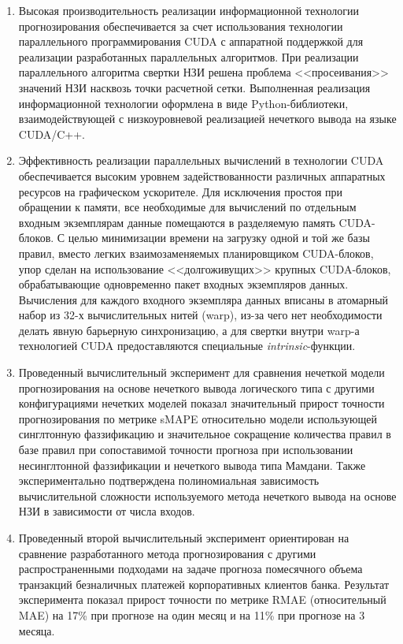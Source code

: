 \begin{enumerate}
	\item Высокая производительность реализации информационной технологии прогнозирования обеспечивается за счет использования технологии параллельного программирования CUDA с аппаратной поддержкой для реализации разработанных параллельных алгоритмов. При реализации параллельного алгоритма свертки НЗИ решена проблема <<просеивания>> значений НЗИ насквозь точки расчетной сетки. Выполненная реализация информационной технологии оформлена в виде Python-библиотеки, взаимодействующей с низкоуровневой реализацией нечеткого вывода на языке CUDA/C++.
	\item Эффективность реализации параллельных вычислений в технологии CUDA обеспечивается высоким уровнем задействованности различных аппаратных ресурсов на графическом ускорителе. Для исключения простоя при обращении к памяти, все необходимые для вычислений по отдельным входным экземплярам данные помещаются в разделяемую память CUDA-блоков. С целью минимизации времени на загрузку одной и той же базы правил, вместо легких взаимозаменяемых планировщиком CUDA-блоков, упор сделан на использование <<долгоживущих>> крупных CUDA-блоков, обрабатывающие одновременно пакет входных экземпляров данных. Вычисления для каждого входного экземпляра данных вписаны в атомарный набор из 32-х вычислительных нитей (warp), из-за чего нет необходимости делать явную барьерную синхронизацию, а для свертки внутри warp-а технологией CUDA предоставляются специальные \textit{intrinsic}-функции.
	\item Проведенный вычислительный эксперимент для сравнения нечеткой модели прогнозирования на основе нечеткого вывода логического типа с другими конфигурациями нечетких моделей показал значительный прирост точности прогнозирования по метрике sMAPE относительно модели использующей синглтонную фаззификацию и значительное сокращение количества правил в базе правил при сопоставимой точности прогноза при использовании несинглтонной фаззификации и нечеткого вывода типа Мамдани. Также экспериментально подтверждена полиномиальная зависимость вычислительной сложности используемого метода нечеткого вывода на основе НЗИ в зависимости от числа входов.
	\item Проведенный второй вычислительный эксперимент ориентирован на сравнение разработанного метода прогнозирования с другими распространенными подходами на задаче прогноза помесячного объема транзакций безналичных платежей корпоративных клиентов банка. Результат эксперимента показал прирост точности по метрике RMAE (относительный MAE) на 17\% при прогнозе на один месяц и на 11\% при прогнозе на 3 месяца.
\end{enumerate}
